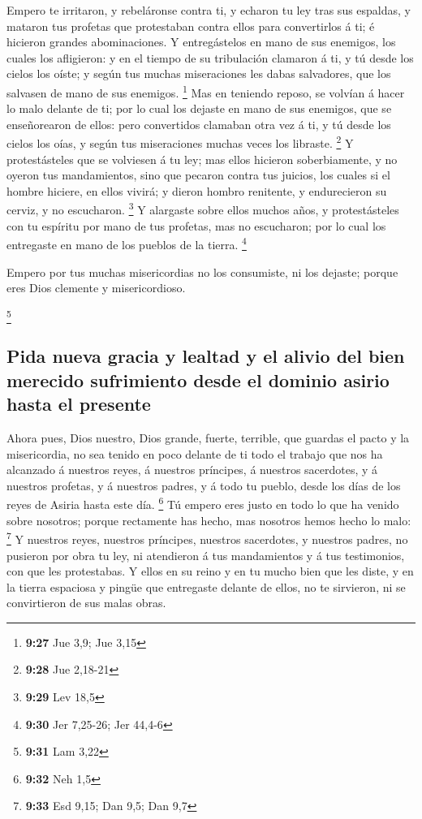  Empero te irritaron, y rebeláronse contra ti, y echaron
tu ley tras sus espaldas, y mataron tus profetas que protestaban contra
ellos para convertirlos á ti; é hicieron grandes abominaciones.
 Y entregástelos en mano de sus enemigos, los cuales los
afligieron: y en el tiempo de su tribulación clamaron á ti, y tú desde
los cielos los oíste; y según tus muchas miseraciones les dabas
salvadores, que los salvasen de mano de sus enemigos. \footnote{\textbf{9:27}
  Jue 3,9; Jue 3,15}  Mas en teniendo reposo, se volvían
á hacer lo malo delante de ti; por lo cual los dejaste en mano de sus
enemigos, que se enseñorearon de ellos: pero convertidos clamaban otra
vez á ti, y tú desde los cielos los oías, y según tus miseraciones
muchas veces los libraste. \footnote{\textbf{9:28} Jue 2,18-21}
 Y protestásteles que se volviesen á tu ley; mas ellos
hicieron soberbiamente, y no oyeron tus mandamientos, sino que pecaron
contra tus juicios, los cuales si el hombre hiciere, en ellos vivirá; y
dieron hombro renitente, y endurecieron su cerviz, y no escucharon.
\footnote{\textbf{9:29} Lev 18,5}  Y alargaste sobre
ellos muchos años, y protestásteles con tu espíritu por mano de tus
profetas, mas no escucharon; por lo cual los entregaste en mano de los
pueblos de la tierra. \footnote{\textbf{9:30} Jer 7,25-26; Jer 44,4-6}

 Empero por tus muchas misericordias no los consumiste,
ni los dejaste; porque eres Dios clemente y misericordioso.

\footnote{\textbf{9:31} Lam 3,22}

\hypertarget{pida-nueva-gracia-y-lealtad-y-el-alivio-del-bien-merecido-sufrimiento-desde-el-dominio-asirio-hasta-el-presente}{%
\subsection{Pida nueva gracia y lealtad y el alivio del bien merecido
sufrimiento desde el dominio asirio hasta el
presente}\label{pida-nueva-gracia-y-lealtad-y-el-alivio-del-bien-merecido-sufrimiento-desde-el-dominio-asirio-hasta-el-presente}}

 Ahora pues, Dios nuestro, Dios grande, fuerte, terrible,
que guardas el pacto y la misericordia, no sea tenido en poco delante de
ti todo el trabajo que nos ha alcanzado á nuestros reyes, á nuestros
príncipes, á nuestros sacerdotes, y á nuestros profetas, y á nuestros
padres, y á todo tu pueblo, desde los días de los reyes de Asiria hasta
este día. \footnote{\textbf{9:32} Neh 1,5}  Tú empero
eres justo en todo lo que ha venido sobre nosotros; porque rectamente
has hecho, mas nosotros hemos hecho lo malo: \footnote{\textbf{9:33} Esd
  9,15; Dan 9,5; Dan 9,7}  Y nuestros reyes, nuestros
príncipes, nuestros sacerdotes, y nuestros padres, no pusieron por obra
tu ley, ni atendieron á tus mandamientos y á tus testimonios, con que
les protestabas.  Y ellos en su reino y en tu mucho bien
que les diste, y en la tierra espaciosa y pingüe que entregaste delante
de ellos, no te sirvieron, ni se convirtieron de sus malas obras.

